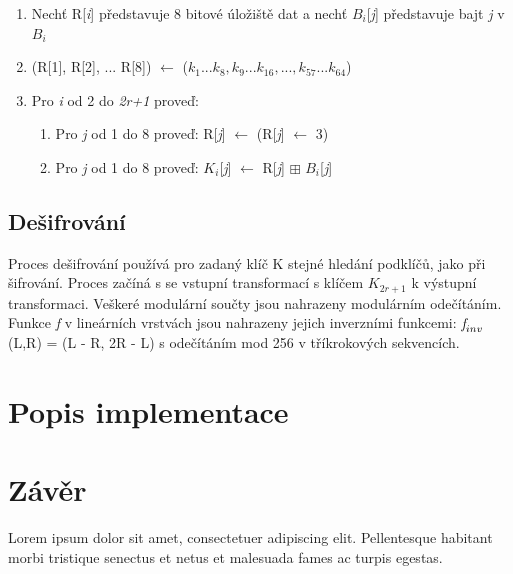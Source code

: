 \documentclass[12pt,a4paper]{article}
\let\oldsection\section
\renewcommand\section{\clearpage\oldsection}
\begin{document}
\begin{enumerate}
\item Nechť R[\emph{i}] představuje 8 bitové úložiště dat a nechť $B_{i}$[\emph{j}] představuje bajt \emph{j} v $B_{i}$
\item (R[1], R[2], ... R[8]) $\leftarrow$ ($k_{1}...k_{8},k_{9}...k_{16},...,k_{57}...k_{64}$)
\item Pro \emph{i} od 2 do \emph{2r+1} proveď: 
\begin{enumerate}
\item Pro \emph{j} od 1 do 8 proveď: R[\emph{j}] $\leftarrow$ (R[\emph{j}] $\leftarrow$ 3)
\item Pro \emph{j} od 1 do 8 proveď: $K_{i}$[\emph{j}] $\leftarrow$ R[\emph{j}] $\boxplus$ $B_{i}$[\emph{j}]
\end{enumerate}
\end{enumerate}

\subsection{Dešifrování}
Proces dešifrování používá pro zadaný klíč K stejné hledání podklíčů, jako při šifrování. Proces začíná s se vstupní transformací s klíčem $K_{2r+1}$ k výstupní transformaci. Veškeré modulární součty jsou nahrazeny modulárním odečítáním.
Funkce \emph{f} v lineárních vrstvách jsou nahrazeny jejich inverzními funkcemi: $\emph{f}_{inv}$(L,R) = (L - R, 2R - L) s odečítáním mod 256 v tříkrokových sekvencích.



{\section{Popis implementace}}


{\section{Závěr}}
Lorem ipsum dolor sit amet, consectetuer adipiscing elit. Pellentesque habitant morbi tristique senectus et netus et malesuada fames ac turpis egestas.

\end{document}
